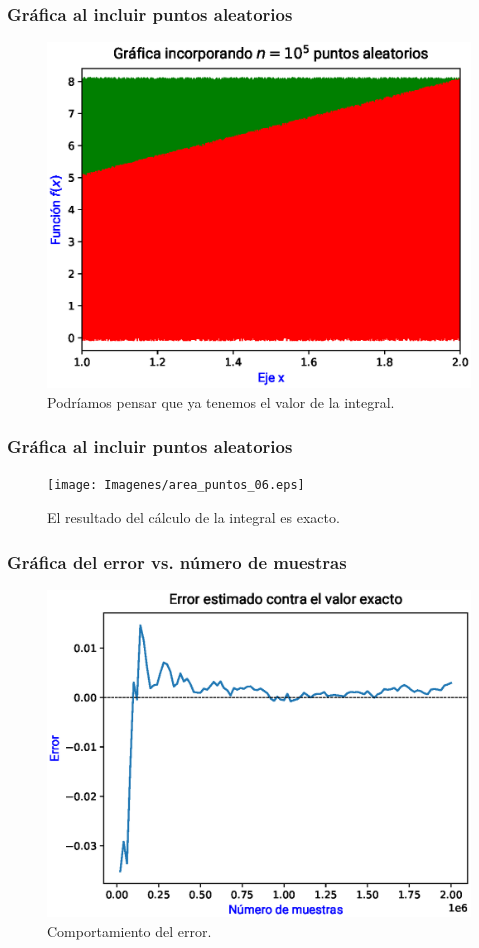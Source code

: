 \begin{frame}
\frametitle{Gráfica al incluir puntos aleatorios}
\begin{figure}
    \centering
    \includegraphics[scale=0.55]{Imagenes/area_puntos_05.eps}
    \caption{Podríamos pensar que ya tenemos el valor de la integral.}
\end{figure}
\end{frame}
\begin{frame}
\frametitle{Gráfica al incluir puntos aleatorios}
\begin{figure}
    \centering
    \texttt{[image: Imagenes/area\_puntos\_06.eps]}
    \caption{El resultado del cálculo de la integral es exacto.}
\end{figure}
\end{frame}
\begin{frame}
\frametitle{Gráfica del error vs. número de muestras}
\begin{figure}
    \centering
    \includegraphics[scale=0.55]{Imagenes/area_puntos_07_error.eps}
    \caption{Comportamiento del error.}
\end{figure}
\end{frame}
